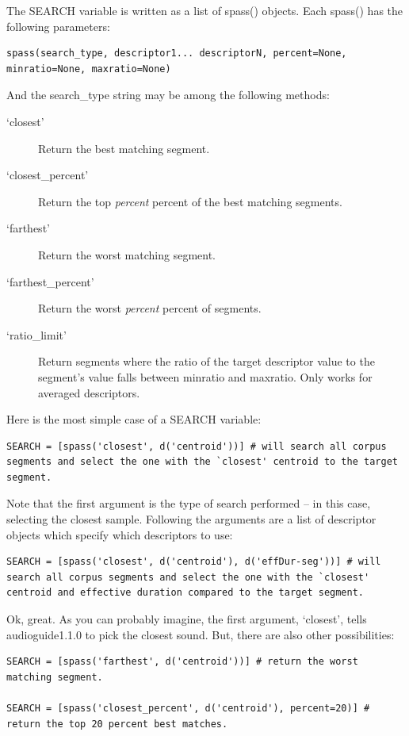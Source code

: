 \documentclass{article}
\newcommand{\ag}{audioguide1.1.0\xspace}
\begin{document}
\begin{spacing}{1.2}
The SEARCH variable is written as a list of spass() objects.  Each spass() has the following parameters: 
\begin{lstlisting}
spass(search_type, descriptor1... descriptorN, percent=None, minratio=None, maxratio=None)
\end{lstlisting}

And the search\_type string may be among the following methods:
\begin{description}
\item[`closest'] Return the best matching segment.
\item[`closest\_percent'] Return the top \emph{percent} percent of the best matching segments.
\item[`farthest'] Return the worst matching segment.
\item[`farthest\_percent'] Return the worst \emph{percent} percent of segments.
\item[`ratio\_limit'] Return segments where the ratio of the target descriptor value to the segment's value falls between minratio and maxratio.  Only works for averaged descriptors.
\end{description}


Here is the most simple case of a SEARCH variable:
\begin{lstlisting}
SEARCH = [spass('closest', d('centroid'))] # will search all corpus segments and select the one with the `closest' centroid to the target segment.
\end{lstlisting}

Note that the first argument is the type of search performed -- in this case, selecting the closest sample.  Following the arguments are a list of descriptor objects which specify which descriptors to use:

\begin{lstlisting}
SEARCH = [spass('closest', d('centroid'), d('effDur-seg'))] # will search all corpus segments and select the one with the `closest' centroid and effective duration compared to the target segment.
\end{lstlisting}

Ok, great.  As you can probably imagine, the first argument, `closest', tells \ag to pick the closest sound.  But, there are also other possibilities:

\begin{lstlisting}
SEARCH = [spass('farthest', d('centroid'))] # return the worst matching segment.

SEARCH = [spass('closest_percent', d('centroid'), percent=20)] # return the top 20 percent best matches.


\end{lstlisting}
\end{spacing}
\end{document}
